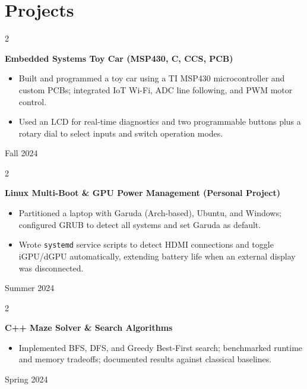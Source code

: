 \documentclass[10pt, letterpaper]{article}
\newenvironment{highlights}{
    \begin{itemize}[
        topsep=0pt,
        parsep=0pt,
        partopsep=0pt,
        itemsep=0pt,
        leftmargin=0.30 cm + 8pt
    ]
}{
    \end{itemize}
}
\newenvironment{twocolentry}[2][]{
    \onecolentry
    \def\secondColumn{#2}
    \setcolumnwidth{\fill, 4.2 cm}
    \begin{paracol}{2}
}{
    \switchcolumn \raggedleft \secondColumn
    \end{paracol}
    \endonecolentry
}
\begin{document}
\vspace{7pt}
\section{Projects}
\begin{twocolentry}{Fall 2024}
    \textbf{Embedded Systems Toy Car (MSP430, C, CCS, PCB)}
    \begin{highlights}
        \item[\textbf{$\vartriangleright$}] Built and programmed a toy car using a TI MSP430 microcontroller and custom PCBs; integrated IoT Wi-Fi, ADC line following, and PWM motor control.
        \item[\textbf{$\vartriangleright$}] Used an LCD for real-time diagnostics and two programmable buttons plus a rotary dial to select inputs and switch operation modes.

    \end{highlights}
\end{twocolentry}

\vspace{5pt}

\begin{twocolentry}{Summer 2024}
    \textbf{Linux Multi-Boot \& GPU Power Management (Personal Project)}
    \begin{highlights}
        \item[\textbf{$\vartriangleright$}] Partitioned a laptop with Garuda (Arch-based), Ubuntu, and Windows; configured GRUB to detect all systems and set Garuda as default.
        \item[\textbf{$\vartriangleright$}] Wrote \texttt{systemd} service scripts to detect HDMI connections and toggle iGPU/dGPU automatically, extending battery life when an external display was disconnected.
    \end{highlights}
\end{twocolentry}

\vspace{5pt}

\begin{twocolentry}{Spring 2024}
    \textbf{C++ Maze Solver \& Search Algorithms}
    \begin{highlights}
        \item[\textbf{$\vartriangleright$}] Implemented BFS, DFS, and Greedy Best-First search; benchmarked runtime and memory tradeoffs; documented results against classical baselines.
    \end{highlights}
\end{twocolentry}
\end{document}
